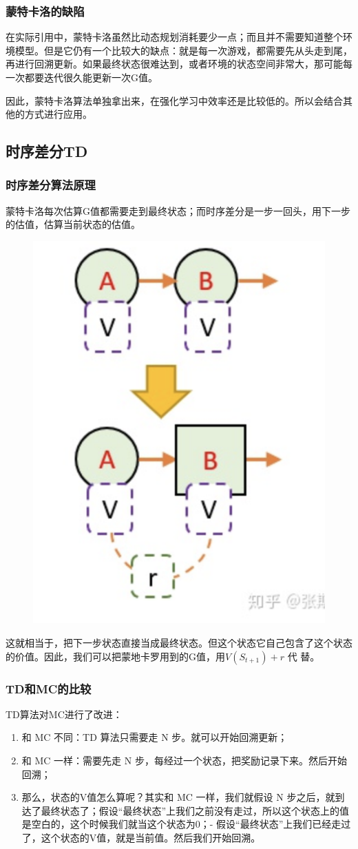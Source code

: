 \documentclass[12pt]{article}
\begin{document}
\subsubsection{蒙特卡洛的缺陷}
在实际引用中，蒙特卡洛虽然比动态规划消耗要少一点；而且并不需要知道整个环境模型。但是它仍有一个比较大的缺点：就是每一次游戏，都需要先从头走到尾，再进行回溯更新。如果最终状态很难达到，或者环境的状态空间非常大，那可能每一次都要迭代很久能更新一次G值。

因此，蒙特卡洛算法单独拿出来，在强化学习中效率还是比较低的。所以会结合其他的方式进行应用。


\subsection{时序差分TD}
\subsubsection{时序差分算法原理}
蒙特卡洛每次估算G值都需要走到最终状态；而时序差分是一步一回头，用下一步的估值，估算当前状态的估值。
\begin{figure}[H]
    \centering
    \includegraphics[width=.2\textwidth]{fig/ReinforcementLearning/RL_Compute_V_By_TD.png}
\end{figure}

这就相当于，把下一步状态直接当成最终状态。但这个状态它自己包含了这个状态的价值。因此，我们可以把蒙地卡罗用到的G值，用$V(S_{t+1})+ r$ 代 替。

\subsubsection{TD和MC的比较}
TD算法对MC进行了改进：
\begin{enumerate}
\setlength{\itemsep}{0pt}
\setlength{\parsep}{0pt}
\setlength{\parskip}{0pt}
    \item 和 MC 不同：TD 算法只需要走 N 步。就可以开始回溯更新；
    \item 和 MC 一样：需要先走 N 步，每经过一个状态，把奖励记录下来。然后开始回溯；
    \item 那么，状态的V值怎么算呢？其实和 MC 一样，我们就假设 N 步之后，就到达了最终状态了；假设“最终状态”上我们之前没有走过，所以这个状态上的值是空白的，这个时候我们就当这个状态为0；- 假设“最终状态”上我们已经走过了，这个状态的V值，就是当前值。然后我们开始回溯。
\end{enumerate}
\end{document}
